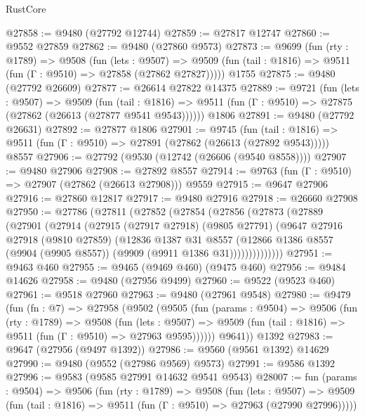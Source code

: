 \begin{lexlean}{RustCore}
\begin{coremodule}
@27858 := @9480 (@27792 @12744)
@27859 := @27817 @12747
@27860 := @9552 @27859
@27862 := @9480 (@27860 @9573)
@27873 := @9699
    (fun (rty : @1789) =>
    @9508
      (fun (lets : @9507) =>
      @9509 (fun (tail : @1816) => @9511 (fun (Γ : @9510) => @27858 (@27862 @27827)))))
    @1755
@27875 := @9480 (@27792 @26609)
@27877 := @26614 @27822 @14375
@27889 := @9721
    (fun (lets : @9507) =>
    @9509
      (fun (tail : @1816) =>
      @9511 (fun (Γ : @9510) => @27875 (@27862 (@26613 (@27877 @9541 @9543))))))
    @1806
@27891 := @9480 (@27792 @26631)
@27892 := @27877 @1806
@27901 := @9745
    (fun (tail : @1816) => @9511 (fun (Γ : @9510) => @27891 (@27862 (@26613 (@27892 @9543)))))
    @8557
@27906 := @27792 (@9530 (@12742 (@26606 (@9540 @8558))))
@27907 := @9480 @27906
@27908 := @27892 @8557
@27914 := @9763 (fun (Γ : @9510) => @27907 (@27862 (@26613 @27908))) @9559
@27915 := @9647 @27906
@27916 := @27860 @12817
@27917 := @9480 @27916
@27918 := @26660 @27908
@27950 := @27786
    (@27811
      (@27852
        (@27854
          (@27856
            (@27873
              (@27889
                (@27901
                  (@27914
                    (@27915
                      (@27917 @27918)
                      (@9805 @27791)
                      (@9647
                        @27916
                        @27918
                        (@9810 @27859)
                        (@12836
                          @1387
                          @31
                          @8557
                          (@12866
                            @1386
                            @8557
                            (@9904 (@9905 @8557))
                            (@9909 (@9911 @1386 @31))))))))))))))
@27951 := @9463 @460
@27955 := @9465 (@9469 @460) (@9475 @460)
@27956 := @9484 @14626
@27958 := @9480 (@27956 @9499)
@27960 := @9522 (@9523 @460)
@27961 := @9518 @27960
@27963 := @9480 (@27961 @9548)
@27980 := @9479
    (fun (fn : @7) =>
    @27958
      (@9502
        (@9505
          (fun (params : @9504) =>
          @9506
            (fun (rty : @1789) =>
            @9508
              (fun (lets : @9507) =>
              @9509 (fun (tail : @1816) => @9511 (fun (Γ : @9510) => @27963 @9595))))))
        @9641))
    @1392
@27983 := @9647 (@27956 (@9497 @1392))
@27986 := @9560 (@9561 @1392) @14629
@27990 := @9480 (@9552 (@27986 @9569) @9573)
@27991 := @9586 @1392
@27996 := @9583 (@9585 @27991 @14632 @9541 @9543)
@28007 := fun (params : @9504) =>
  @9506
    (fun (rty : @1789) =>
    @9508
      (fun (lets : @9507) =>
      @9509 (fun (tail : @1816) => @9511 (fun (Γ : @9510) => @27963 (@27990 @27996)))))

\end{coremodule}
\end{lexlean}
